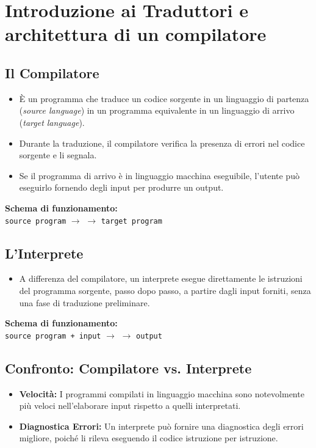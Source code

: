 \section{Introduzione ai Traduttori e architettura di un compilatore}

\subsection{Il Compilatore}
\begin{itemize}
    \item È un programma che traduce un codice sorgente in un linguaggio di partenza (\textit{source language}) in un programma equivalente in un linguaggio di arrivo (\textit{target language}).
    \item Durante la traduzione, il compilatore verifica la presenza di errori nel codice sorgente e li segnala.
    \item Se il programma di arrivo è in linguaggio macchina eseguibile, l'utente può eseguirlo fornendo degli input per produrre un output.
\end{itemize}
\textbf{Schema di funzionamento:}\\
\texttt{source program} $\rightarrow$  $\rightarrow$ \texttt{target program}

\subsection{L'Interprete}
\begin{itemize}
    \item A differenza del compilatore, un interprete esegue direttamente le istruzioni del programma sorgente, passo dopo passo, a partire dagli input forniti, senza una fase di traduzione preliminare.
\end{itemize}
\textbf{Schema di funzionamento:}\\
\texttt{source program + input} $\rightarrow$  $\rightarrow$ \texttt{output}

\subsection{Confronto: Compilatore vs. Interprete}
\begin{itemize}
    \item \textbf{Velocità:} I programmi compilati in linguaggio macchina sono notevolmente più veloci nell'elaborare input rispetto a quelli interpretati.
    \item \textbf{Diagnostica Errori:} Un interprete può fornire una diagnostica degli errori migliore, poiché li rileva eseguendo il codice istruzione per istruzione.
\end{itemize}

